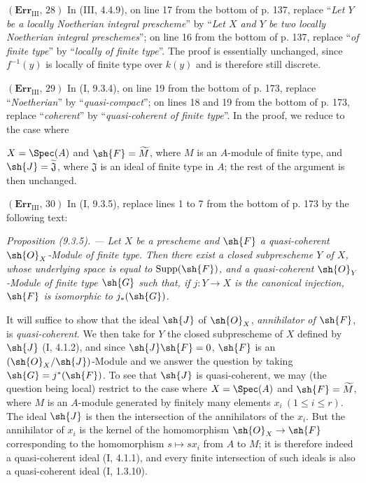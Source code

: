 \noindent\textbf{$(\mathbf{Err}_{\mathrm{III}},\,28)$} In (III, 4.4.9), on
line 17 from the bottom of p. 137, replace ``\emph{Let $Y$ be a locally
Noetherian integral prescheme}'' by ``\emph{Let $X$ and $Y$ be two locally
Noetherian integral preschemes}''; on line 16 from the bottom of p. 137,
replace ``\emph{of finite type}'' by ``\emph{locally of finite type}''. The
proof is essentially unchanged, since $f^{-1}(y)$ is locally of finite type
over $k(y)$ and is therefore still discrete.

\noindent\textbf{$(\mathbf{Err}_{\mathrm{III}},\,29)$} In (I, 9.3.4), on line
19 from the bottom of p. 173, replace ``\emph{Noetherian}'' by
``\emph{quasi-compact}''; on lines 18 and 19 from the bottom of p. 173,
replace ``\emph{coherent}'' by ``\emph{quasi-coherent of finite type}''. In
the proof, we reduce to the case where

$X=\Spec(A)$ and $\sh{F}=\widetilde M$, where $M$ is an $A$-module of finite
type, and $\sh{J}=\widetilde{\mathfrak J}$, where $\mathfrak J$ is an ideal of
finite type in $A$; the rest of the argument is then unchanged.

\noindent\textbf{$(\mathbf{Err}_{\mathrm{III}},\,30)$} In (I, 9.3.5),
replace lines 1 to 7 from the bottom of p. 173 by the following text:

\emph{Proposition (9.3.5). --- Let $X$ be a prescheme and $\sh{F}$ a
quasi-coherent $\sh{O}_X$-Module of finite type. Then there exist a closed
subprescheme $Y$ of $X$, whose underlying space is equal to
$\operatorname{Supp}(\sh{F})$, and a quasi-coherent $\sh{O}_Y$-Module of
finite type $\sh{G}$ such that, if $j:Y\to X$ is the canonical injection,
$\sh{F}$ is isomorphic to $j_*(\sh{G})$.}

It will suffice to show that the ideal $\sh{J}$ of $\sh{O}_X$,
\emph{annihilator of $\sh{F}$}, is \emph{quasi-coherent}. We then take for $Y$
the closed subprescheme of $X$ defined by $\sh{J}$ (I, 4.1.2), and since
$\sh{J}\sh{F}=0$, $\sh{F}$ is an $(\sh{O}_X/\sh{J})$-Module and we answer the
question by taking $\sh{G}=j^*(\sh{F})$. To see that $\sh{J}$ is
quasi-coherent, we may (the question being local) restrict to the case where
$X=\Spec(A)$ and $\sh{F}=\widetilde M$, where $M$ is an $A$-module generated
by finitely many elements $x_i\ (1\leq i\leq r)$. The ideal $\sh{J}$ is then
the intersection of the annihilators of the $x_i$. But the annihilator of
$x_i$ is the kernel of the homomorphism $\sh{O}_X\to\sh{F}$ corresponding to
the homomorphism $s\mapsto sx_i$ from $A$ to $M$; it is therefore indeed a
quasi-coherent ideal (I, 4.1.1), and every finite intersection of such ideals
is also a quasi-coherent ideal (I, 1.3.10).
